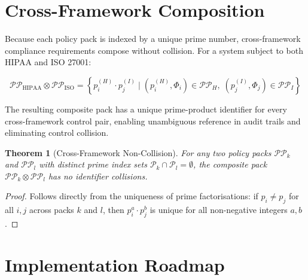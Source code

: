 \documentclass[12pt,letterpaper]{article}
\theoremstyle{definition}
\theoremstyle{plain}
\newtheorem{theorem}{Theorem}[section]
\theoremstyle{remark}
\begin{document}
\section{Cross-Framework Composition}
\label{sec:composition}

Because each policy pack is indexed by a unique prime number, cross-framework
compliance requirements compose without collision. For a system subject to both
HIPAA and ISO 27001:

\begin{equation}
\mathcal{PP}_{\text{HIPAA}} \otimes \mathcal{PP}_{\text{ISO}} =
\left\{ p_i^{(H)} \cdot p_j^{(I)} \mid
  (p_i^{(H)}, \Phi_i) \in \mathcal{PP}_H,\;
  (p_j^{(I)}, \Phi_j) \in \mathcal{PP}_I
\right\}
\label{eq:crosscomp}
\end{equation}

The resulting composite pack has a unique prime-product identifier for every
cross-framework control pair, enabling unambiguous reference in audit trails and
eliminating control collision.

\begin{theorem}[Cross-Framework Non-Collision]
For any two policy packs $\mathcal{PP}_k$ and $\mathcal{PP}_l$ with distinct
prime index sets $\mathcal{P}_k \cap \mathcal{P}_l = \emptyset$, the composite
pack $\mathcal{PP}_k \otimes \mathcal{PP}_l$ has no identifier collisions.
\end{theorem}

\begin{proof}
Follows directly from the uniqueness of prime factorisations: if $p_i \neq p_j$
for all $i, j$ across packs $k$ and $l$, then $p_i^{a} \cdot p_j^{b}$ is unique
for all non-negative integers $a, b$.
\end{proof}

\section{Implementation Roadmap}
\label{sec:roadmap}
\end{document}
